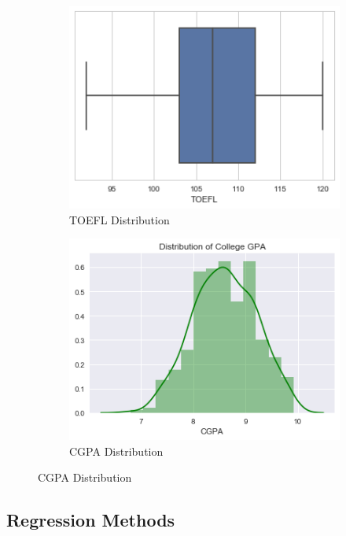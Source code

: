 \documentclass[12pt]{article}
\begin{document}
\begin{sloppypar}
 \begin{figure}[H]
 \centering
  \begin{subfigure}[b]{0.45\textwidth}
    \includegraphics[width=\textwidth]{TOEFL.png}
    \caption{TOEFL Distribution}
    \label{fig:1}
  \end{subfigure}
  \begin{subfigure}[b]{0.45\textwidth}
    \includegraphics[width=\textwidth]{CGPA.png}
    \caption{CGPA Distribution}
    \label{fig:2}
  \end{subfigure}
\end{figure}
 
\subsection{Regression Methods}


\end{sloppypar}
\end{document}

